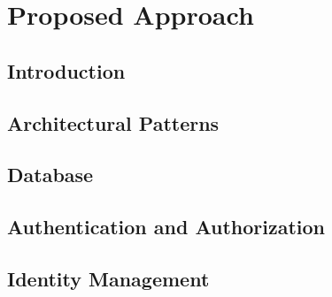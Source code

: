 \chapter{Proposed Approach}

\ifpdf
    \graphicspath{{Chapter3/Figs/Raster/}{Chapter3/Figs/PDF/}{Chapter3/Figs/}}
\else
    \graphicspath{{Chapter3/Figs/Vector/}{Chapter3/Figs/}}
\fi

\section{Introduction}




\section{Architectural Patterns}
\section{Database}

\section{Authentication and Authorization}
\section{Identity Management}

